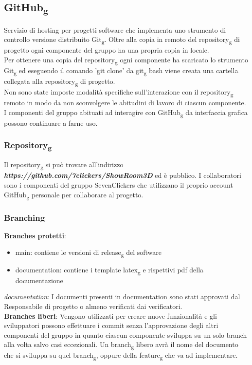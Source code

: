 \subsection{GitHub\textsubscript{g}}
Servizio di hosting per progetti software che implementa uno strumento di controllo versione distribuito Git\textsubscript{g}.
Oltre alla copia in remoto del repository\textsubscript{g} di progetto ogni componente del gruppo ha una propria copia in locale.\\
Per ottenere una copia del repository\textsubscript{g} ogni componente ha scaricato lo strumento Git\textsubscript{g} ed eseguendo il 
comando 'git clone' da git\textsubscript{g} bash viene creata una cartella collegata alla repository\textsubscript{g} di progetto.\\
Non sono state imposte modalità specifiche sull'interazione con il repository\textsubscript{g} remoto in modo da non sconvolgere le abitudini di lavoro di 
ciascun componente.\\
I componenti del gruppo abituati ad interagire con GitHub\textsubscript{g} da interfaccia grafica possono continuare a farne uso.
\subsubsection{Repository\textsubscript{g}}
Il repository\textsubscript{g} si può trovare all'indirizzo \textbf{\textit{https://github.com/7clickers/ShowRoom3D}} ed è pubblico. 
I collaboratori sono i componenti del gruppo SevenClickers che utilizzano il proprio account GitHub\textsubscript{g} personale per collaborare al progetto.
\subsubsection{Branching}
\textbf{Branches protetti}:
    \begin{itemize} 
        \item main: contiene le versioni di release\textsubscript{g} del software
        \item documentation: contiene i template latex\textsubscript{g} e rispettivi pdf della documentazione
    \end{itemize}
\textit{documentation}: 
I documenti presenti in documentation sono stati approvati dal Responsabile di progetto o almeno verificati dai verificatori.\\
\textbf{Branches liberi}: 
Vengono utilizzati per creare nuove funzionalità e gli sviluppatori possono effettuare i commit senza l'approvazione degli altri componenti del gruppo
in quanto ciascun componente sviluppa su un solo branch alla volta salvo casi eccezionali.
Un branch\textsubscript{g} libero avrà il nome del documento che si sviluppa su quel branch\textsubscript{g}, oppure della feature\textsubscript{g} che va ad implementare.
